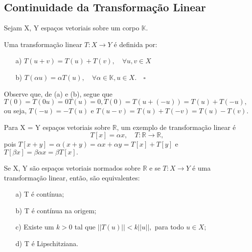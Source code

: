 \documentclass[MetricSpaces/metric_notes.tex]{subfiles}
\begin{document}
\subsection{Continuidade da Transformação Linear}
Sejam X, Y espaços vetoriais sobre um corpo \(\mathbb{K}\).
\begin{def*}
	Uma transformação linear \(T:X\rightarrow Y\) é definida por:
	\begin{itemize}
		\item[a)] \(T(u+v)=T(u)+T(v),\quad \forall u, v\in X\)
		\item[b)] \(T(\alpha u) = \alpha T(u),\quad \forall \alpha \in \mathbb{K}, u\in X.\quad\square\)
	\end{itemize}
\end{def*}
Observe que, de (a) e (b), segue que \(T(0) = T(0u) = 0T(u) = 0, T(0) = T(u+(-u)) = T(u) + T(-u),\) ou seja,
\(T(-u) = -T(u)\) e \(T(u-v) = T(u) + T(-v) = T(u) - T(v)\).
\begin{example}
	Para X = Y espaços vetoriais sobre \(\mathbb{R}\), um exemplo de transformação linear é
	\[
		T[x] = \alpha x,\quad T:\mathbb{R}\rightarrow \mathbb{R},
	\]
	pois \(T[x+y] = \alpha (x+y) = \alpha x + \alpha y = T[x] + T[y]\) e \(T[\beta x] = \beta \alpha x = \beta T[x].\)
\end{example}
\begin{theorem*}
	Se X, Y são espaços vetoriais normados sobre \(\mathbb{R}\) e se \(T:X\rightarrow Y\) é uma transformação linear, então, são equivalentes:
	\begin{itemize}
		\item[a)] T é contínua;
		\item[b)] T é contínua na origem;
		\item[c)] Existe um \(k > 0\) tal que \(||T(u)|| < k||u||,\) para todo \(u\in X\);
		\item[d)] T é Lipschitziana.
	\end{itemize}
\end{theorem*}
\end{document}
